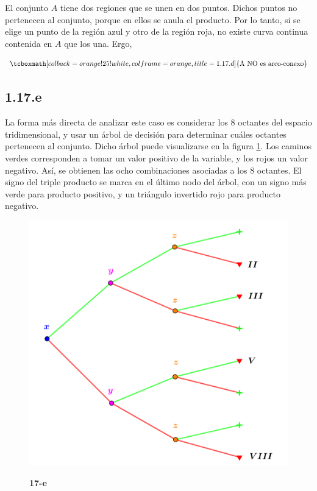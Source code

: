 \documentclass{article}
\begin{document}
El conjunto $A$ tiene dos regiones que se unen en dos puntos. Dichos puntos no pertenecen al conjunto, porque en ellos se anula el producto. Por lo tanto, si se elige un punto de la región azul y otro de la región roja, no existe curva continua contenida en $A$ que los una. Ergo,

\begin{equation}
\tcboxmath[colback=orange!25!white,colframe=orange,title=1.17.d]
{ \text{A NO es arco-conexo} }
\end{equation}

\subsection*{1.17.e}
\label{subsec:1.17.e}

La forma más directa de analizar este caso es considerar los 8 octantes del espacio tridimensional, y usar un árbol de decisión para determinar cuáles octantes pertenecen al conjunto. Dicho árbol puede visualizarse en la figura \ref{fig:1-17-e}. Los caminos verdes corresponden a tomar un valor positivo de la variable, y los rojos un valor negativo. Así, se obtienen las ocho combinaciones asociadas a los 8 octantes. El signo del triple producto se marca en el último nodo del árbol, con un signo más verde para producto positivo, y un triángulo invertido rojo para producto negativo.

\begin{figure}[ht]
\caption{\textbf{17-e}}
\includegraphics[scale=0.5]{../img/exercises/guide_01/17_e.png} 
\centering
\label{fig:1-17-e}
\end{figure}
\end{document}
